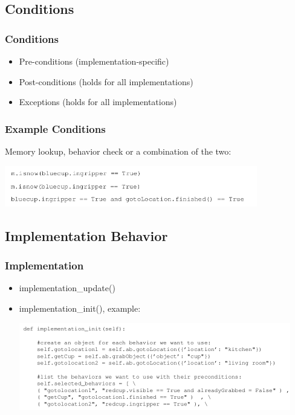 \documentclass[]{beamer}
\begin{document}
\subsection{Conditions}
\begin{frame}
    \frametitle{Conditions}
    \begin{itemize}
        \item Pre-conditions (implementation-specific)
        \item Post-conditions (holds for all implementations)
        \item Exceptions (holds for all implementations)
    \end{itemize}
\end{frame}

\begin{frame}
    \frametitle{Example Conditions}
    Memory lookup, behavior check or a combination of the two:
    \begin{center}
        \includegraphics[height=0.7in]{img/conditions.png}
    \end{center}
\end{frame}

\subsection{Implementation Behavior}

\begin{frame}
    \frametitle{Implementation}
    \begin{itemize}
        \item implementation\_update()
        \item implementation\_init(), example:
        \begin{center}
            \includegraphics[height=1.5in]{img/implementation_init.png}
        \end{center}
    \end{itemize}
\end{frame}
\end{document}
